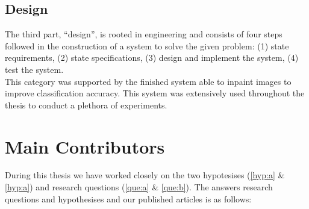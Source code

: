 \subsection{Design}
The third part, ``design'', is rooted in engineering
and consists of four steps followed in the construction
of a system to solve the given problem: (1) state requirements, (2) state specifications, (3) design and implement the system, (4) test the system. \\

This category was supported by the finished system able to inpaint images to improve classification accuracy. This system was extensively used throughout the thesis to conduct a plethora of experiments.



\section{Main Contributors}
During this thesis we have worked closely on the two hypotesises (\ref{hyp:a} \& \ref{hyp:a}) and research questions (\ref{que:a} \& \ref{que:b}). 
The answers research questions and hypothesises and our published articles is as follows:

